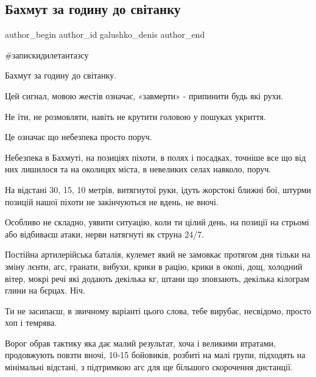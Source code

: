  
 
 
 
 

\subsection{Бахмут  за  годину до світанку}
\label{sec:10_12_2022.fb.galushko_denis.1.bakhmut__za__godinu_}

\ifcmt
 author_begin
   author_id galushko_denis
 author_end
\fi

\#запискидилетантазсу

Бахмут  за  годину до світанку. 

Цей сигнал, мовою  жестів означає, «завмерти» - припинити будь які рухи.  

Не їти, не розмовляти, навіть не крутити головою у пошуках укриття. 

Це означає що небезпека просто поруч. 

Небезпека в Бахмуті, на позиціях піхоти, в полях і посадках, точніше все що
від них лишилося та на околицях міста, в невеликих селах навколо, поруч.

На відстані 30, 15, 10 метрів, витягнутої руки, ідуть жорстокі ближні бої,
штурми позицій нашої піхоти не закінчуються не вдень, не вночі.

Особливо не складно, уявити ситуацію, коли ти цілий день,  на позиції на стрьомі або відбиваєш атаки, нерви натягнуті як струна 24/7.

Постійна артилерійська баталія, кулемет який не замовкає протягом дня тільки
на зміну лєнти, агс, гранати, вибухи, крики в рацію, крики в окопі, дощ,
холодний вітер, мокрі речі які додають декілька кг, штани що зповзають,
декілька кілограм глини на бєрцах. Ніч. 

Ти не засипаєш, в звичному варіанті цього слова, тебе вирубає, несвідомо, просто хоп і темрява.

Ворог обрав тактику яка дає малий результат, хоча і великими втратами,
продовжують повзти вночі, 10-15 бойовиків, розбиті на малі групи, підходять
на мінімальні відстані, з підтримкою агс для ще більшого скорочення
дистанції.

